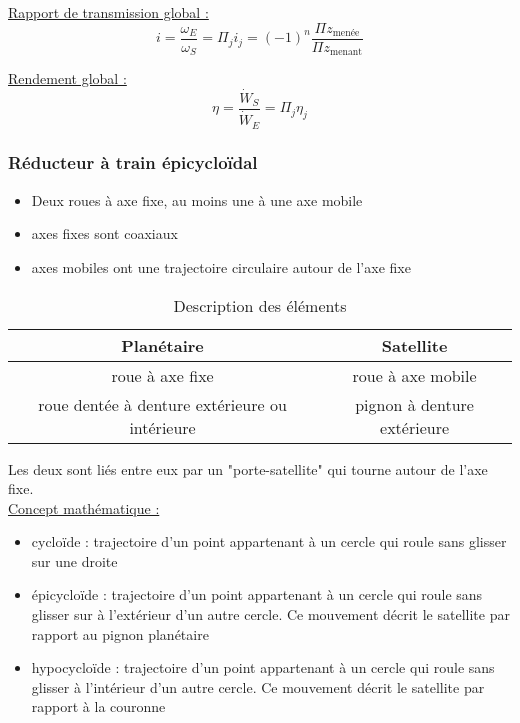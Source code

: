 \documentclass[../main.tex]{subfiles}
\begin{document}
\quad \underline{Rapport de transmission global :} \begin{equation}
    i = \frac{\omega_E}{\omega_S} = \Pi_j i_j = (-1)^n \frac{\Pi z_{\text{menée}}}{\Pi z_{\text{menant}}}
\end{equation}

\quad \underline{Rendement global :} \begin{equation}
    \eta = \frac{\dot{W}_S}{\dot{W}_E} = \Pi_j \eta_j
\end{equation}

\subsubsection{Réducteur à train épicycloïdal}
\begin{itemize}
    \item Deux roues à axe fixe, au moins une à une axe mobile\\
    \item axes fixes sont coaxiaux\\
    \item axes mobiles ont une trajectoire circulaire autour de l'axe fixe\\
\end{itemize}

\begin{table}[hbt!]
    \centering
    \begin{tabular}{c|c}
        Planétaire & Satellite \\
        \hline
        roue à axe fixe & roue à axe mobile\\
        roue dentée à denture extérieure ou intérieure & pignon à denture extérieure\\
    \end{tabular}
    \caption{Description des éléments}
\end{table}
Les deux sont liés entre eux par un "porte-satellite" qui tourne autour de l'axe fixe.\\

\quad \underline{Concept mathématique :}\\
\begin{itemize}
    \item cycloïde : trajectoire d'un point appartenant à un cercle qui roule sans glisser sur une droite\\
    \item épicycloïde : trajectoire d'un point appartenant à un cercle qui roule sans glisser sur à l'extérieur d'un autre cercle. Ce mouvement décrit le satellite par rapport au pignon planétaire\\
    \item hypocycloïde : trajectoire d'un point appartenant à un cercle qui roule sans glisser à l'intérieur d'un autre cercle. Ce mouvement décrit le satellite par rapport à la couronne\\
\end{itemize}
\end{document}
